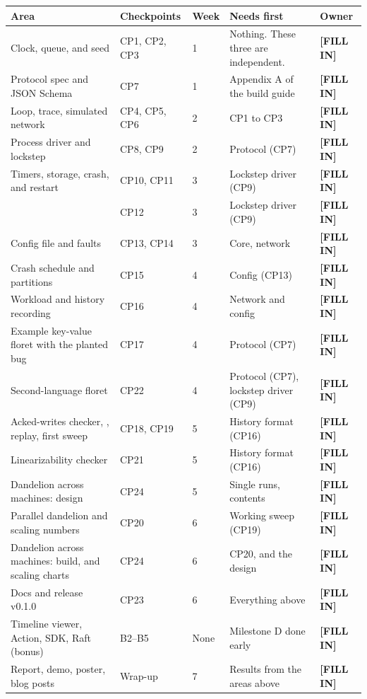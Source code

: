 \documentclass[12pt,letterpaper]{article}
\newcommand{\code}[1]{\texttt{\detokenize{#1}}}
\begin{document}
\begin{center}
\small
\begin{tabularx}{\linewidth}{@{}X l l X l@{}}
\toprule
\textbf{Area} & \textbf{Checkpoints} & \textbf{Week} & \textbf{Needs first} & \textbf{Owner} \\
\midrule
Clock, queue, and seed & CP1, CP2, CP3 & 1 & Nothing. These three are independent. & \textbf{[FILL IN]} \\
Protocol spec and JSON Schema & CP7 & 1 & Appendix A of the build guide & \textbf{[FILL IN]} \\
Loop, trace, simulated network & CP4, CP5, CP6 & 2 & CP1 to CP3 & \textbf{[FILL IN]} \\
Process driver and lockstep & CP8, CP9 & 2 & Protocol (CP7) & \textbf{[FILL IN]} \\
Timers, storage, crash, and restart & CP10, CP11 & 3 & Lockstep driver (CP9) & \textbf{[FILL IN]} \\
\code{check-determinism} & CP12 & 3 & Lockstep driver (CP9) & \textbf{[FILL IN]} \\
Config file and faults & CP13, CP14 & 3 & Core, network & \textbf{[FILL IN]} \\
Crash schedule and partitions & CP15 & 4 & Config (CP13) & \textbf{[FILL IN]} \\
Workload and history recording & CP16 & 4 & Network and config & \textbf{[FILL IN]} \\
Example key-value floret with the planted bug & CP17 & 4 & Protocol (CP7) & \textbf{[FILL IN]} \\
Second-language floret & CP22 & 4 & Protocol (CP7), lockstep driver (CP9) & \textbf{[FILL IN]} \\
Acked-writes checker, \code{.pappus}, replay, first sweep & CP18, CP19 & 5 & History format (CP16) & \textbf{[FILL IN]} \\
Linearizability checker & CP21 & 5 & History format (CP16) & \textbf{[FILL IN]} \\
Dandelion across machines: design & CP24 & 5 & Single runs, \code{.pappus} contents & \textbf{[FILL IN]} \\
Parallel dandelion and scaling numbers & CP20 & 6 & Working sweep (CP19) & \textbf{[FILL IN]} \\
Dandelion across machines: build, and scaling charts & CP24 & 6 & CP20, and the design & \textbf{[FILL IN]} \\
Docs and release v0.1.0 & CP23 & 6 & Everything above & \textbf{[FILL IN]} \\
Timeline viewer, Action, SDK, Raft (bonus) & B2--B5 & None & Milestone D done early & \textbf{[FILL IN]} \\
Report, demo, poster, blog posts & Wrap-up & 7 & Results from the areas above & \textbf{[FILL IN]} \\
\bottomrule
\end{tabularx}
\end{center}
\end{document}
